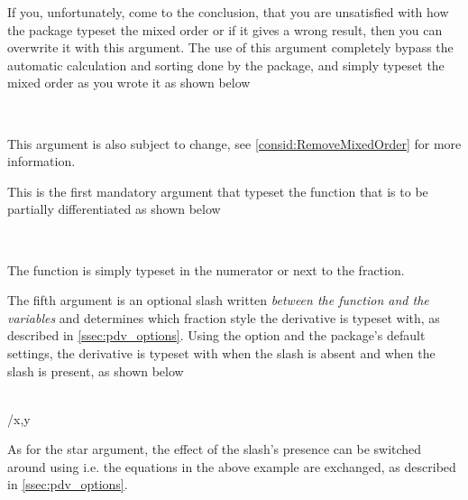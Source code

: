 \documentclass[final,british,10pt]{scrartcl}
\theoremstyle{remark}
\begin{document}
\begin{function}
		\begin{argument}{3}
			If you, unfortunately, come to the conclusion, that you are unsatisfied with how the package typeset the mixed order or if it gives a wrong result, then you can overwrite it with this argument. The use of this argument completely bypass the automatic calculation and sorting done by the package, and simply typeset the mixed order as you wrote it as shown below
			
			\begin{example}
				 \\
			\end{example}
			
			\noindent This argument is also subject to change, see \cref{consid:RemoveMixedOrder} for more information.
		\end{argument}
		
		\begin{argument}{4}
			This is the first mandatory argument that typeset the function that is to be partially differentiated as shown below
			
			\begin{example}
				\pdv{ f(x,y,z) }{ x, y, z } \\
				\pdv{ e^x \sin(y) \ln(z) }{ x, y, z }
			\end{example}
			
			\noindent The function is simply typeset in the numerator or next to the fraction.
		\end{argument}
		
		\begin{argument}{5}
			The fifth argument is an optional slash written \emph{between the function and the variables} and determines which fraction style the derivative is typeset with, as described in \cref{ssec:pdv_options}. Using the option  and the package's default settings, the derivative is typeset with  when the slash is absent and  when the slash is present, as shown below
			
			\begin{example}
				\pdv{f}{x,y} \\
				\pdv{f}/{x,y}
			\end{example}
			
			\noindent As for the star argument, the effect of the slash's presence can be switched around using  i.e. the equations in the above example are exchanged, as described in \cref{ssec:pdv_options}.
		\end{argument}
		

\end{function}
\end{document}

